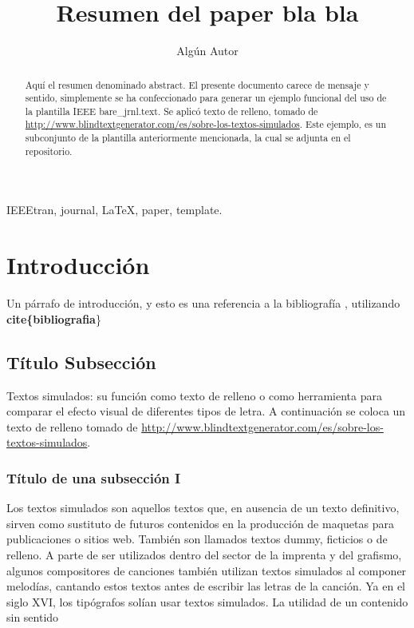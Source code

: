 \documentclass[journal]{IEEEtran} %
\begin{document}
%
\title{Resumen del paper bla bla}
\author{Algún Autor}
%

\maketitle


\begin{abstract}
Aquí el resumen denominado abstract. El presente documento carece de mensaje y sentido, simplemente se ha confeccionado para generar un ejemplo funcional del uso de la plantilla IEEE bare\_jrnl.text.
Se aplicó texto de relleno, tomado de \url{http://www.blindtextgenerator.com/es/sobre-los-textos-simulados}.
Este ejemplo, es un subconjunto de la plantilla anteriormente mencionada, la cual se adjunta en el repositorio.
\end{abstract}

\begin{keywords}
IEEEtran, journal, \LaTeX, paper, template.
\end{keywords}


\section{Introducción}
Un párrafo de introducción, y esto es una referencia a la bibliografía \cite{IEEEhowto:kopka}, utilizando \textbf{\\cite\{bibliografia}\}


\subsection{Título Subsección}
Textos simulados: su función como texto de relleno o como herramienta para comparar el efecto visual de diferentes tipos de letra.
A continuación se coloca un texto de relleno tomado de  \url{http://www.blindtextgenerator.com/es/sobre-los-textos-simulados}.

\subsubsection{Título de una subsección I}
Los textos simulados son aquellos textos que, en ausencia de un texto definitivo, sirven como sustituto de futuros contenidos en la producción de maquetas para publicaciones o sitios web. También son llamados textos dummy, ficticios o de relleno. A parte de ser utilizados dentro del sector de la imprenta y del grafismo, algunos compositores de canciones también utilizan textos simulados al componer melodías, cantando estos textos antes de escribir las letras de la canción. Ya en el siglo XVI, los tipógrafos solían usar textos simulados.
La utilidad de un contenido sin sentido
\end{document}
